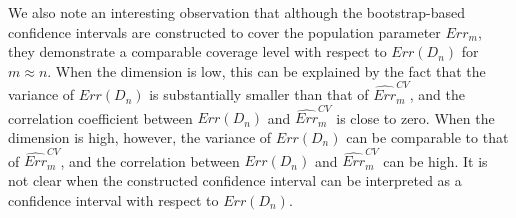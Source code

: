 \documentclass[12pt]{article}
\begin{document}
We also note an interesting observation that although the bootstrap-based confidence intervals are constructed to cover the population parameter $Err_m$, they demonstrate a comparable coverage level with respect to $Err(D_n)$ for $m\approx n.$ When the dimension is low, this can be explained by the fact that the variance of $Err(D_n)$ is substantially smaller than that of $\widehat{Err}_m^{CV}$, and the correlation coefficient between $Err(D_n)$ and $\widehat{Err}_m^{CV}$ is close to zero. When the dimension is high, however, the variance of $Err(D_n)$ can be comparable to that of $\widehat{Err}_m^{CV}$, and the correlation between $Err(D_n)$ and $\widehat{Err}_m^{CV}$ can be high. It is not clear when the constructed confidence interval can be interpreted as a confidence interval with respect to $Err(D_n)$.
\end{document}
